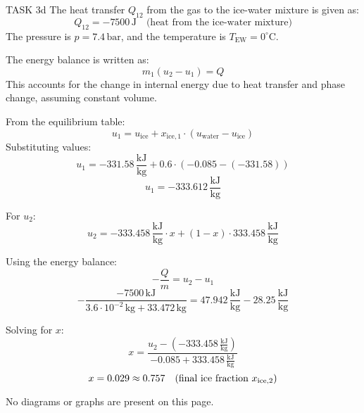 TASK 3d  
The heat transfer \( Q_{12} \) from the gas to the ice-water mixture is given as:  
\[
Q_{12} = -7500 \, \text{J} \quad \text{(heat from the ice-water mixture)}  
\]  
The pressure is \( p = 7.4 \, \text{bar} \), and the temperature is \( T_{\text{EW}} = 0^\circ\text{C} \).  

The energy balance is written as:  
\[
m_1 (u_2 - u_1) = Q  
\]  
This accounts for the change in internal energy due to heat transfer and phase change, assuming constant volume.  

From the equilibrium table:  
\[
u_1 = u_{\text{ice}} + x_{\text{ice},1} \cdot (u_{\text{water}} - u_{\text{ice}})  
\]  
Substituting values:  
\[
u_1 = -331.58 \, \frac{\text{kJ}}{\text{kg}} + 0.6 \cdot (-0.085 - (-331.58))  
\]  
\[
u_1 = -333.612 \, \frac{\text{kJ}}{\text{kg}}  
\]  

For \( u_2 \):  
\[
u_2 = -333.458 \, \frac{\text{kJ}}{\text{kg}} \cdot x + (1 - x) \cdot 333.458 \, \frac{\text{kJ}}{\text{kg}}  
\]  

Using the energy balance:  
\[
-\frac{Q}{m} = u_2 - u_1  
\]  
\[
-\frac{-7500 \, \text{kJ}}{3.6 \cdot 10^{-2} \, \text{kg} + 33.472 \, \text{kg}} = 47.942 \, \frac{\text{kJ}}{\text{kg}} - 28.25 \, \frac{\text{kJ}}{\text{kg}}  
\]  

Solving for \( x \):  
\[
x = \frac{u_2 - (-333.458 \, \frac{\text{kJ}}{\text{kg}})}{-0.085 + 333.458 \, \frac{\text{kJ}}{\text{kg}}}  
\]  
\[
x = 0.029 \approx 0.757 \quad \text{(final ice fraction \( x_{\text{ice},2} \))}  
\]  

No diagrams or graphs are present on this page.